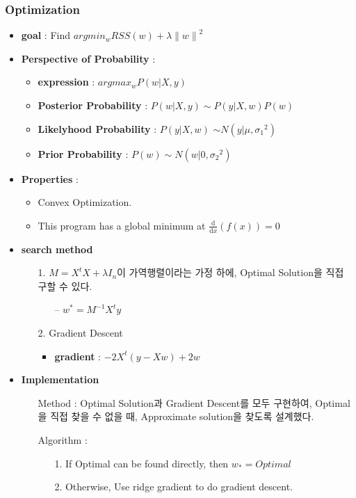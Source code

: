 \documentclass{article}
\begin{document}
\subsubsection{Optimization}
\begin{itemize}
    \item \textbf{goal} : Find $argmin_w RSS(w) + \lambda{\|w\|}^2$
    \item \textbf{Perspective of Probability} : 
         \begin{itemize}
             \item \textbf{expression} : $argmax_w P(w|X,y)$
             \item \textbf{Posterior Probability} : $P(w|X,y) \sim P(y|X,w)P(w)$
             \item \textbf{Likelyhood Probability} : $P(y|X,w)$ $\sim N(y|\mu, {\sigma_1}^{2})$
             \item \textbf{Prior Probability} : $P(w) \sim N(w|0, {\sigma_2}^{2})$
         \end{itemize}
    \item \textbf{Properties} : 
    \begin{itemize}
        \item Convex Optimization.
        \item This program has a global minimum at $\frac{\mathrm d}{\mathrm d x} \left( f(x) \right)=0$
    \end{itemize}
    \item \textbf{search method}
    \begin{itemize}
        \item[1.] $M = X^tX+\lambda I_n$이 가역행렬이라는 가정 하에, Optimal Solution을 직접 구할 수 있다.
        \begin{itemize}
            \item[--] $w^* = M^{-1}X^{t}y$
        \end{itemize}
        
        \item[2.] Gradient Descent
        \begin{itemize}
            \item \textbf{gradient} : $-2X^t(y-Xw) + 2w$
        \end{itemize}
    \end{itemize}
    
    \item \textbf{Implementation}
        \begin{itemize}
            \item[Method] : Optimal Solution과 Gradient Descent를 모두 구현하여, Optimal을 직접 찾을 수 없을 때, Approximate solution을 찾도록 설계했다.
            \item[Algorithm] : 
                \begin{itemize}
                    \item[1.] If Optimal can be found directly, then $w_* = Optimal$
                    \item[2.] Otherwise, Use ridge gradient to do gradient descent.
                \end{itemize}
        \end{itemize}
\end{itemize}
\end{document}
